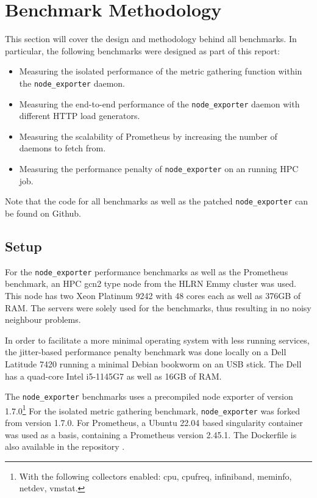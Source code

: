 \section{Benchmark Methodology}
This section will cover the design and methodology behind all benchmarks. In particular, the following
benchmarks were designed as part of this report:

\begin{itemize}
  \item Measuring the isolated performance of the metric gathering function within the \texttt{node\_exporter} daemon.
  \item Measuring the end-to-end performance of the \texttt{node\_exporter} daemon with different HTTP load generators.
  \item Measuring the scalability of Prometheus by increasing the number of daemons to fetch from.
  \item Measuring the performance penalty of \texttt{node\_exporter} on an running \ac{HPC} job.
\end{itemize}

Note that the code for all benchmarks \cite{my_repo} as well as the patched \texttt{node\_exporter} \cite{my_node_exporter}
can be found on Github.

\subsection{Setup}

For the \texttt{node\_exporter} performance benchmarks as well as the Prometheus benchmark, an \ac{HPC} 
gcn2 type node from the HLRN Emmy cluster was used. This node has two Xeon Platinum 9242 with 48 cores each
as well as 376GB of RAM. The servers were solely used for the benchmarks, thus resulting in
no noisy neighbour problems.

In order to facilitate a more minimal operating system with less running services, the jitter-based 
performance penalty benchmark was done locally on a Dell Latitude 7420 running a minimal
Debian bookworm on an USB stick. The Dell has a quad-core Intel i5-1145G7 as well as 16GB of RAM.

The \texttt{node\_exporter} benchmarks uses a precompiled node exporter of version 1.7.0\footnote{With the following collectors enabled: cpu, cpufreq, infiniband, meminfo, netdev, vmstat.}
For the isolated metric gathering benchmark, 
\texttt{node\_exporter} was forked from version 1.7.0. For Prometheus, a Ubuntu 22.04 based singularity
container was used as a basis, containing a Prometheus version 2.45.1. The Dockerfile is also available
in the repository \cite{my_repo}.

